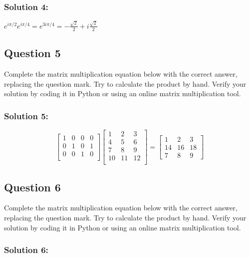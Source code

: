 \documentclass{article}
\begin{document}
\subsubsection*{Solution 4:}

$e^{i\pi/2}e^{i\pi/4}=e^{3i\pi/4}=-\frac{\sqrt2}{2}+i\frac{\sqrt2}{2}$

\subsection*{Question 5}

Complete the matrix multiplication equation below with the correct answer, replacing the question mark. Try to calculate the product by hand. Verify your solution by coding it in Python or using an online matrix multiplication tool.

\subsubsection*{Solution 5:}

\begin{equation*}
\begin{bmatrix}
    1 & 0 & 0 & 0 \\
    0 & 1 & 0 & 1 \\
    0 & 0 & 1 & 0 \\
\end{bmatrix}
\begin{bmatrix}
     1 & 2 & 3 \\
     4 & 5 & 6 \\
     7 & 8 & 9 \\
    10 & 11 & 12 \\
\end{bmatrix}
=
\begin{bmatrix}1&2&3\\14&16&18\\7&8&9\end{bmatrix}
\end{equation*}

\subsection*{Question 6}

Complete the matrix multiplication equation below with the correct answer, replacing the question mark. Try to calculate the product by hand. Verify your solution by coding it in Python or using an online matrix multiplication tool.

\subsubsection*{Solution 6:}
\end{document}
